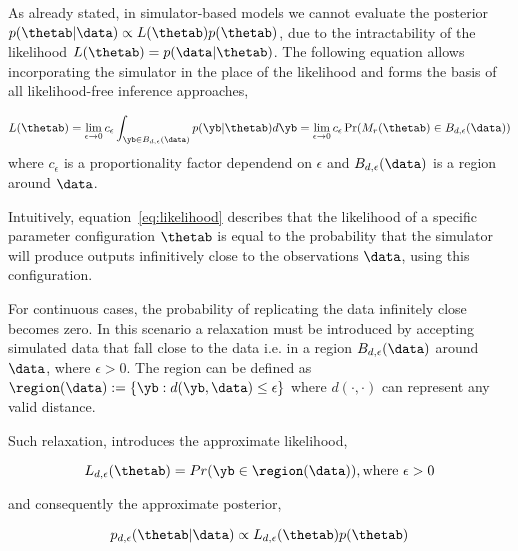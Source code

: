 As already stated, in simulator-based models we cannot evaluate the
posterior $p(\thetab|\data) \propto L(\thetab)p(\thetab)$, due to the
intractability of the likelihood $L(\thetab) = p(\data|\thetab)$. The
following equation allows incorporating the simulator in the place of
the likelihood and forms the basis of all likelihood-free inference
approaches,

\begin{equation} \label{eq:likelihood}
  L(\thetab) =
  \lim_{\epsilon \to 0} c_\epsilon \int_{\yb \in B_{d,\epsilon}(\data)} p(\yb|\thetab)d\yb =
  \lim_{\epsilon \to 0} c_\epsilon \Pr(M_r(\thetab) \in B_{d,\epsilon}(\data))
\end{equation}
%
where $c_\epsilon$ is a proportionality factor dependend on
$\epsilon$ and $B_{d,\epsilon}(\data)$ is a region around $\data$.

Intuitively, equation~\ref{eq:likelihood} describes that the
likelihood of a specific parameter configuration $\thetab$ is equal to
the probability that the simulator will produce outputs infinitively
close to the observations $\data$, using this configuration.

For continuous cases, the probability of replicating the data
infinitely close becomes zero. In this scenario a relaxation must be
introduced by accepting simulated data that fall close to the data
i.e. in a region $B_{d,\epsilon}(\data)$ around $\data$, where
$\epsilon > 0$. The region can be
defined as $\region (\data) := \{\yb: d(\yb, \data) \leq \epsilon \}$
where $d(\cdot, \cdot)$ can represent any valid distance.

Such relaxation, introduces the approximate likelihood,

\begin{equation} \label{eq:approx_likelihood}
  L_{d, \epsilon}(\thetab) = Pr(\yb \in \region(\data)), \text{where  } \epsilon > 0
\end{equation}

and consequently the approximate posterior,

\begin{equation} \label{eq:approx_posterior}
  p_{d,\epsilon}(\thetab|\data) \propto L_{d, \epsilon}(\thetab) p(\thetab)
\end{equation}